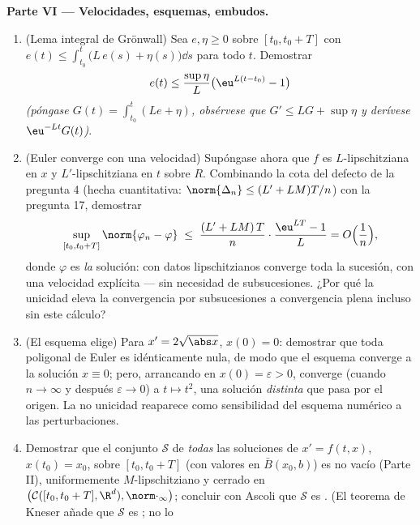 \begin{problem}[{Problema de fin de semana --- existencia de soluciones
de
$x' = f(t, x)$ sin hipótesis de Lipschitz}]
\medskip
\noindent\textbf{Parte VI --- Velocidades, esquemas, embudos.}
\begin{enumerate}[resume]
  \item (Lema integral de Grönwall) Sea $e, \eta \geq 0$
   sobre $[t_0, t_0+T]$ con
  $e(t) \leq \int_{t_0}
        ^t\bigl(L\,e(s) + \eta(s)\bigr)\dd s$ para todo $t$. Demostrar
        \[
        e(t) \leq \frac{\sup\eta}{L}\bigl(\eu^{L(t - t_0)} -
        1\bigr)
        \]
        \emph{(póngase $G(t) = \int_{t_0}^t(Le + \eta)$, obsérvese que
        $G'
        \leq LG + \sup\eta$ y derívese
        $\eu^{-Lt}G(t)$)}.
  \item (Euler converge con una velocidad) Supóngase ahora que $f$ es
  $L$-lipschitziana en $x$ y $L'$-lipschitziana en $t$ sobre $R$.
  Combinando la cota del defecto de la pregunta 4 (hecha cuantitativa:
  $\norm{\Delta_n} \leq (L' + LM)T/n$) con la pregunta 17, demostrar
        \[
        \sup_{[t_0, t_0+T]}\norm{\varphi_n - \varphi}
        \;\leq\; \frac{(L' + LM)\,T}{n}\cdot
        \frac{\eu^{LT} - 1}{L} = O\Bigl(\frac1n\Bigr),
        \]
        donde $\varphi$ es \emph{la} solución: con datos lipschitzianos
        converge toda la sucesión, con una velocidad explícita --- sin
        necesidad de subsucesiones. ¿Por qué la unicidad eleva la
        convergencia por subsucesiones a convergencia plena incluso sin
        este cálculo? \item (El esquema elige) Para
        $x' = 2\sqrt{\abs x}$, $x(0) =
        0$: demostrar que toda poligonal de Euler es idénticamente nula,
        de modo que el esquema converge a la solución $x \equiv 0$;
        pero, arrancando en $x(0) = \varepsilon > 0$, converge (cuando
        $n \to \infty$ y después $\varepsilon \to 0$) a $t
        \mapsto t^2$, una solución \emph{distinta} que pasa por el
        origen. La no unicidad reaparece como sensibilidad del esquema
        numérico a las perturbaciones. \item Demostrar que el conjunto
        $\mathcal S$ de \emph{todas} las soluciones de $x' = f(t,x)$,
        $x(t_0) = x_0$, sobre $[t_0, t_0+T]$ (con valores en
        $\bar B(x_0, b)$) es no vacío (Parte II), uniformemente
        $M$-lipschitziano y cerrado en
        $\bigl(\mathcal C([t_0, t_0+T], \R^d),
        \norm\cdot_\infty\bigr)$; concluir con Ascoli que $\mathcal S$
        es \emph{}. (El
        teorema de Kneser añade que $\mathcal S$ es
        ; no lo

\end{enumerate}
\end{problem}
